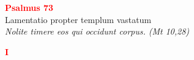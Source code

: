 


\def\greinitialformat#1{%
{\fontsize{39}{39}\selectfont #1}%
}




\vspace{0.3cm}
\begin{center}
 \textcolor{red}{\large \bf Psalmus 73}\\
Lamentatio propter templum vastatum\\
\textit{\small Nolite timere eos qui occidunt corpus. (Mt 10,28)}
\end{center}
\begin{center}
\textcolor{red}{\bf I}
\end{center}
